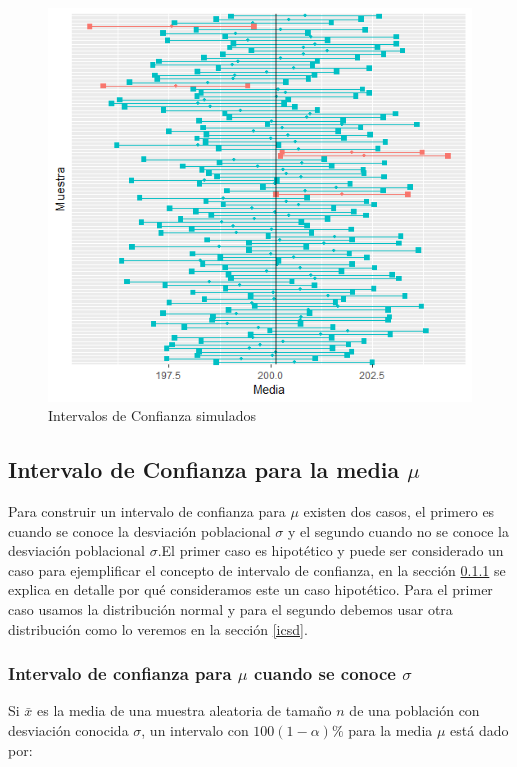 \documentclass[]{book}
\begin{document}
\begin{figure}[h]

{\centering \includegraphics[width=0.7\linewidth]{ic} 

}

\caption{Intervalos de Confianza simulados}\label{fig:ic}
\end{figure}

\subsection{\texorpdfstring{Intervalo de Confianza para la media
\(\mu\)}{Intervalo de Confianza para la media \textbackslash{}mu}}\label{intervalo-de-confianza-para-la-media-mu}

Para construir un intervalo de confianza para \(\mu\) existen dos casos,
el primero es cuando se conoce la desviación poblacional \(\sigma\) y el
segundo cuando no se conoce la desviación poblacional \(\sigma\).El
primer caso es hipotético y puede ser considerado un caso para
ejemplificar el concepto de intervalo de confianza, en la sección
\ref{jt} se explica en detalle por qué consideramos este un caso
hipotético. Para el primer caso usamos la distribución normal y para el
segundo debemos usar otra distribución como lo veremos en la sección
\ref{icsd}.

\subsubsection{\texorpdfstring{Intervalo de confianza para \(\mu\)
cuando se conoce
\(\sigma\)}{Intervalo de confianza para \textbackslash{}mu cuando se conoce \textbackslash{}sigma}}\label{jt}

Si \(\bar{x}\) es la media de una muestra aleatoria de tamaño \(n\) de
una población con desviación conocida \(\sigma\), un intervalo con
\(100\left(1-\alpha\right)\%\) para la media \(\mu\) está dado por:
\end{document}
